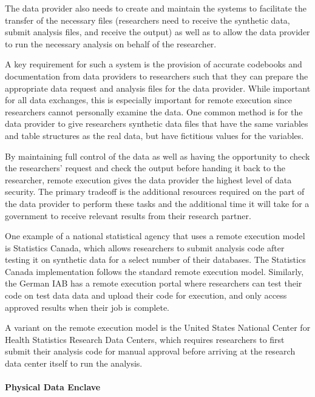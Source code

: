 The data provider also needs to create and maintain the systems to
facilitate the transfer of the necessary files (researchers need to
receive the synthetic data, submit analysis files, and receive the
output) as well as to allow the data provider to run the necessary
analysis on behalf of the researcher.

A key requirement for such a system is the provision of accurate
codebooks and documentation from data providers to researchers such that
they can prepare the appropriate data request and analysis files for the
data provider. While important for all data exchanges, this is
especially important for remote execution since researchers cannot
personally examine the data. One common method is for the data provider
to give researchers synthetic data files that have the same variables
and table structures as the real data, but have fictitious values for
the variables.

By maintaining full control of the data as well as having the
opportunity to check the researchers' request and check the output
before handing it back to the researcher, remote execution gives the
data provider the highest level of data security. The primary tradeoff
is the additional resources required on the part of the data provider to
perform these tasks and the additional time it will take for a
government to receive relevant results from their research partner.

One example of a national statistical agency that uses a remote
execution model is Statistics Canada, which allows researchers to submit
analysis code after testing it on synthetic data for a select number of
their databases. The Statistics Canada implementation follows the
standard remote execution model. Similarly, the German IAB has a remote
execution portal where researchers can test their code on test data data
and upload their code for execution, and only access approved results
when their job is complete.

A variant on the remote execution model is the United States National
Center for Health Statistics Research Data Centers, which requires
researchers to first submit their analysis code for manual approval
before arriving at the research data center itself to run the analysis.

\hypertarget{physical-data-enclave}{%
\paragraph{Physical Data Enclave}\label{physical-data-enclave}}

